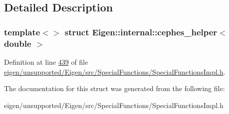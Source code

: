 \subsection{Detailed Description}
\subsubsection*{template$<$$>$\newline
struct Eigen\+::internal\+::cephes\+\_\+helper$<$ double $>$}



Definition at line \hyperlink{eigen_2unsupported_2_eigen_2src_2_special_functions_2_special_functions_impl_8h_source_l00439}{439} of file \hyperlink{eigen_2unsupported_2_eigen_2src_2_special_functions_2_special_functions_impl_8h_source}{eigen/unsupported/\+Eigen/src/\+Special\+Functions/\+Special\+Functions\+Impl.\+h}.



The documentation for this struct was generated from the following file\+:\begin{DoxyCompactItemize}
\item 
eigen/unsupported/\+Eigen/src/\+Special\+Functions/\+Special\+Functions\+Impl.\+h\end{DoxyCompactItemize}

